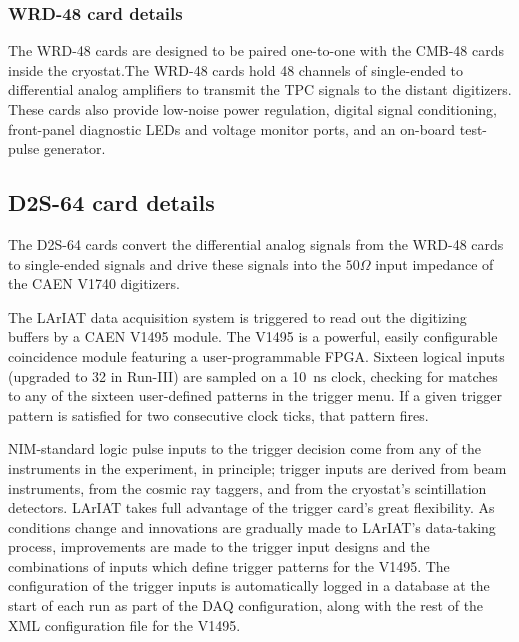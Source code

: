 \subsubsection*{WRD-48 card details}
The WRD-48 cards are designed to be paired one-to-one with the CMB-48 cards inside the cryostat.The WRD-48 cards hold 48 channels of single-ended to differential analog amplifiers to transmit the TPC signals to the distant digitizers. These cards also provide low-noise power regulation, digital signal conditioning, front-panel diagnostic LEDs and voltage monitor ports, and an on-board test-pulse generator. 

\subsection*{D2S-64 card details}
The D2S-64 cards convert the differential analog signals from the WRD-48 cards to single-ended signals and drive these signals into the $50 \Omega$ input impedance of the CAEN V1740 digitizers.

The LArIAT data acquisition system is triggered to read out the digitizing buffers by a CAEN V1495 module. The V1495 is a powerful, easily configurable coincidence module featuring a user-programmable FPGA.  Sixteen logical inputs (upgraded to 32 in Run-III) are sampled on a 10~ns clock, checking for matches to any of the sixteen user-defined patterns in the trigger menu.  If a given trigger pattern is satisfied for two consecutive clock ticks, that pattern fires. 

NIM-standard logic pulse inputs to the trigger decision come from any of the instruments in the experiment, in principle; trigger inputs are derived from beam instruments, from the cosmic ray taggers, and from the cryostat's scintillation detectors. LArIAT takes full advantage of the trigger card's great flexibility.  As conditions change and innovations are gradually made to LArIAT's data-taking process, improvements are made to the trigger input designs and the combinations of inputs which define trigger patterns for the V1495.  The configuration of the trigger inputs is automatically logged in a database at the start of each run as part of the DAQ configuration, along with the rest of the XML configuration file for the V1495.

